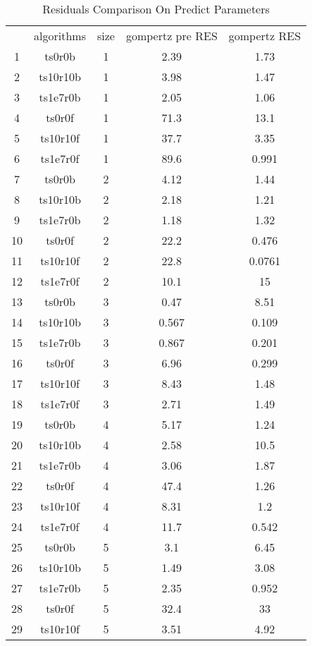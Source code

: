 \begin{table}[hbtp]
\caption{Residuals Comparison On Predict Parameters}
\centering
\begin{tabular}{|ccccc|}
\hline
 & algorithms & size & gompertz pre RES & gompertz RES \\
   1 & ts0r0b &    1 & 2.39 & 1.73 \\
   2 & ts10r10b &    1 & 3.98 & 1.47 \\
   3 & ts1e7r0b &    1 & 2.05 & 1.06 \\
   4 & ts0r0f &    1 & 71.3 & 13.1 \\
   5 & ts10r10f &    1 & 37.7 & 3.35 \\
   6 & ts1e7r0f &    1 & 89.6 & 0.991 \\
   7 & ts0r0b &    2 & 4.12 & 1.44 \\
   8 & ts10r10b &    2 & 2.18 & 1.21 \\
   9 & ts1e7r0b &    2 & 1.18 & 1.32 \\
  10 & ts0r0f &    2 & 22.2 & 0.476 \\
  11 & ts10r10f &    2 & 22.8 & 0.0761 \\
  12 & ts1e7r0f &    2 & 10.1 &   15 \\
  13 & ts0r0b &    3 & 0.47 & 8.51 \\
  14 & ts10r10b &    3 & 0.567 & 0.109 \\
  15 & ts1e7r0b &    3 & 0.867 & 0.201 \\
  16 & ts0r0f &    3 & 6.96 & 0.299 \\
  17 & ts10r10f &    3 & 8.43 & 1.48 \\
  18 & ts1e7r0f &    3 & 2.71 & 1.49 \\
  19 & ts0r0b &    4 & 5.17 & 1.24 \\
  20 & ts10r10b &    4 & 2.58 & 10.5 \\
  21 & ts1e7r0b &    4 & 3.06 & 1.87 \\
  22 & ts0r0f &    4 & 47.4 & 1.26 \\
  23 & ts10r10f &    4 & 8.31 &  1.2 \\
  24 & ts1e7r0f &    4 & 11.7 & 0.542 \\
  25 & ts0r0b &    5 &  3.1 & 6.45 \\
  26 & ts10r10b &    5 & 1.49 & 3.08 \\
  27 & ts1e7r0b &    5 & 2.35 & 0.952 \\
  28 & ts0r0f &    5 & 32.4 &   33 \\
  29 & ts10r10f &    5 & 3.51 & 4.92 \\

\end{tabular}
\end{table}
